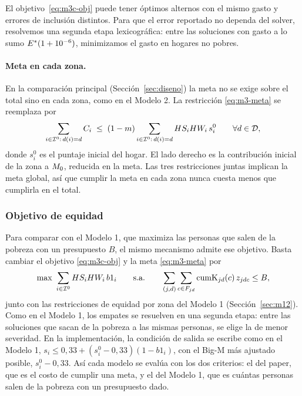 El objetivo~\eqref{eq:m3c-obj} puede tener óptimos alternos con el mismo gasto
y errores de inclusión distintos. Para que el error reportado no dependa del
solver, resolvemos una segunda etapa lexicográfica: entre las soluciones con
gasto a lo sumo $E^*(1+10^{-6})$, minimizamos el gasto en hogares no pobres.

\paragraph{Meta en cada zona.} En la comparación principal
(Sección~\ref{sec:diseno}) la meta no se exige sobre el total sino en cada zona,
como en el Modelo 2. La restricción \eqref{eq:m3-meta} se reemplaza por
\begin{equation}\label{eq:m3-meta-zona}
\sum_{i\in\mathcal{I}^0:\,d(i)=d}C_i\;\le\;(1-m)\sum_{i\in\mathcal{I}^0:\,d(i)=d}HS_iHW_i\,s_i^0
\qquad\forall d\in\mathcal{D},
\end{equation}
donde $s_i^0$ es el puntaje inicial del hogar. El lado derecho es la
contribución inicial de la zona a $M_0$, reducida en la meta. Las tres
restricciones juntas implican la meta global, así que cumplir la meta en cada
zona nunca cuesta menos que cumplirla en el total.

\subsubsection{Objetivo de equidad}

Para comparar con el Modelo 1, que maximiza las personas que salen de la pobreza
con un presupuesto $B$, el mismo mecanismo admite ese objetivo. Basta cambiar
el objetivo \eqref{eq:m3c-obj} y la meta \eqref{eq:m3-meta} por
\[
\max\ \sum_{i\in\mathcal{I}^0}HS_iHW_i\,b1_i
\qquad\text{s.a.}\qquad
\sum_{(j,d)}\sum_{c\in F_{jd}}\mathrm{cumK}_{jd}(c)\,z_{jdc}\le B,
\] junto con las restricciones
de equidad por zona del Modelo 1 (Sección~\ref{sec:m12}). Como en el Modelo 1,
los empates se resuelven en una segunda etapa: entre las soluciones que sacan de
la pobreza a las mismas personas, se elige la de menor severidad. En la
implementación, la condición de salida se escribe como en el Modelo 1,
$s_i\le 0{,}33+(s_i^0-0{,}33)(1-b1_i)$, con el Big-M más ajustado posible,
$s_i^0-0{,}33$. Así cada modelo se
evalúa con los dos criterios: el del paper, que es el costo de cumplir una meta,
y el del Modelo 1, que es cuántas personas salen de la pobreza con un
presupuesto dado.
